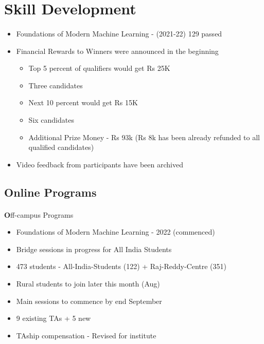 \section{Skill Development }
\begin{frame}[fragile=singleslide]{\insertsectionhead}
  \framesubtitle{\insertsubsectionhead}
\begin{center}
\begin{itemize}
\item Foundations of Modern Machine Learning - (2021-22) 129 passed
\item Financial Rewards to Winners were announced in the beginning 
\begin{itemize}
\item Top 5 percent of qualifiers would get Rs 25K
\item Three candidates
\item Next 10 percent would get Rs 15K
\item Six candidates
\item Additional Prize Money - Rs 93k (Rs 8k has been already refunded to all qualified candidates)
\end{itemize}
\item Video feedback from participants have been archived
\end{itemize}
\end{center}
\end{frame}

\subsection{Online Programs}
\begin{frame}[fragile=singleslide]{\insertsectionhead}
  \framesubtitle{\insertsubsectionhead}
  \textbf  Off-campus Programs
  \begin{itemize}
    \item Foundations of Modern Machine Learning - 2022 (commenced)
   \item Bridge sessions in progress for All India Students
    \item 473 students - All-India-Students (122) + Raj-Reddy-Centre (351) 
    \item Rural students to join later this month (Aug)
\item Main sessions to commence by end September
    \item 9 existing TAs + 5 new 
    \item TAship compensation - Revised for institute
  \end{itemize}
\end{frame}



